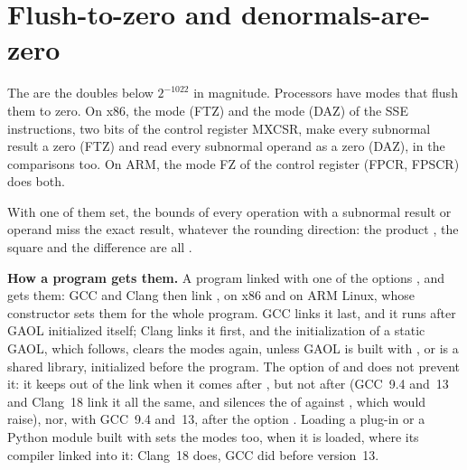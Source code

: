 \documentclass[12pt,a4paper,twoside,openright]{book}
\begin{document}
\section{Flush-to-zero and denormals-are-zero}\label{sec:ftz}
%
%
%
%
%

\begin{Def}\label{def:ftz}
The  are the doubles below $2^{-1022}$ in magnitude.
Processors have modes that flush them to zero. On x86, the
 mode (FTZ) and the  mode (DAZ) of
the SSE instructions, two bits of the control register MXCSR, make every
subnormal result a zero (FTZ) and read every subnormal operand as a zero
(DAZ), in the comparisons too. On ARM, the mode FZ of the control register
(FPCR, FPSCR) does both.
\end{Def}

\noindent
With one of them set, the bounds of every operation with a subnormal result
or operand miss the exact result, whatever the rounding direction:
the product , the square
 and the difference
 are all .\newinvfive

\medskip
\noindent
\textbf{How a program gets them.} A program linked with one of the options
,  and 
gets them: GCC and Clang then link , on x86 and on ARM
Linux, whose constructor sets them for the whole program. GCC links it last,
and it runs after GAOL initialized itself; Clang links it first, and the
initialization of a static GAOL, which follows, clears the modes again,
unless GAOL is built with , or is a shared
library, initialized before the program. The option 
of  and  does not prevent it: it keeps
 out of the link when it comes after
, but not after  (GCC~9.4 and~13 and
Clang~18 link it all the same, and  silences the
 of  against ,
which  would raise), nor, with GCC~9.4 and~13, after the
option . Loading a plug-in or a Python
module built with  sets the modes too, when it is loaded,
where its compiler linked  into it: Clang~18 does, GCC
did before version~13.
\end{document}
